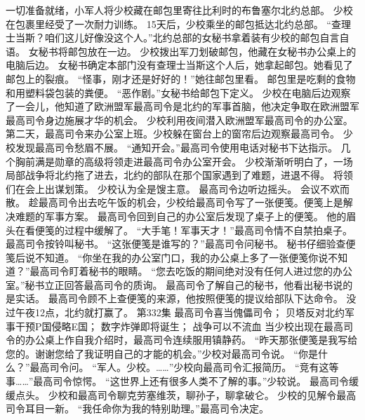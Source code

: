 \documentclass[a4paper,12pt,UTF8,twoside]{ctexbook}
\begin{document}
        一切准备就绪，小军人将少校藏在邮包里寄往比利时的布鲁塞尔北约总部。  
        少校在包裹里经受了一次耐力训练。  
        15天后，少校乘坐的邮包抵达北约总部。  
        “查理士当斯？咱们这儿好像没这个人。”北约总部的女秘书拿着装有少校的邮包自言自语。  
        女秘书将邮包放在一边。  
        少校拨出军刀划破邮包，他藏在女秘书办公桌上的电脑后边。  
        女秘书确定本部门没有查理士当斯这个人后，她拿起邮包。她看见了邮包上的裂痕。  
        “怪事，刚才还是好好的！”她往邮包里看。  
        邮包里是吃剩的食物和用塑料袋包装的粪便。  
        “恶作剧。”女秘书给邮包下定义。  
        少校在电脑后边观察了一会儿，他知道了欧洲盟军最高司令是北约的军事首脑，他决定争取在欧洲盟军最高司令身边施展才华的机会。  
        少校利用夜间潜入欧洲盟军最高司令的办公室。  
        第二天，最高司令来办公室上班。少校躲在窗台上的窗帘后边观察最高司令。  
        少校发现最高司令愁眉不展。  
        “通知开会。”最高司令使用电话对秘书下达指示。  
        几个胸前满是勋章的高级将领走进最高司令办公室开会。  
        少校渐渐听明白了，一场局部战争将北约拖了进去，北约的部队在那个国家遇到了难题，进退不得。  
        将领们在会上出谋划策。        
        少校认为全是馊主意。  
        最高司令边听边摇头。  
        会议不欢而散。  
        趁最高司令出去吃午饭的机会，少校给最高司令写了一张便笺。便笺上是解决难题的军事方案。  
        最高司令回到自己的办公室后发现了桌子上的便笺。  
        他的眉头在看便笺的过程中缓解了。  
        “大手笔！军事天才！”最高司令情不自禁拍桌子。  
        最高司令按铃叫秘书。  
        “这张便笺是谁写的？”最高司令问秘书。  
        秘书仔细验查便笺后说不知道。  
        “你坐在我的办公室门口，我的办公桌上多了一张便笺你说不知道？”最高司令盯着秘书的眼睛。  
        “您去吃饭的期间绝对没有任何人进过您的办公室。”秘书立正回答最高司令的质询。  
        最高司令了解自己的秘书，他看出秘书说的是实话。  
        最高司令顾不上查便笺的来源，他按照便笺的提议给部队下达命令。  
        没过午夜12点，北约就打赢了。          第332集  
        最高司令喜当傀儡司令；  
        贝塔反对北约军事干预P国侵略E国；  
        数字炸弹即将诞生；  
        战争可以不流血    
        当少校出现在最高司令的办公桌上作自我介绍时，最高司令连续服用镇静药。  
        “昨天那张便笺是我写给您的。谢谢您给了我证明自己的才能的机会。”少校对最高司令说。  
        “你是什么？”最高司令问。  
        “军人。少校。……”少校向最高司令汇报简历。  
        “竞有这等事……”最高司令惊愕。  
        “这世界上还有很多人类不了解的事。”少较说。  
        最高司令缓缓点头。        
        少校和最高司令聊克劳塞维茨，聊孙子，聊拿破仑。  
        少校的见解令最高司令耳目一新。  
        “我任命你为我的特别助理。”最高司令决定。  
\end{document}
